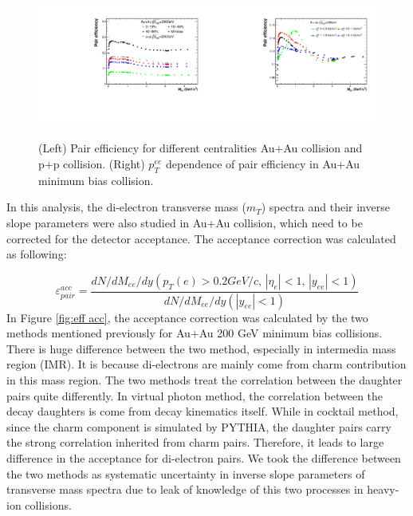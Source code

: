 \begin{figure}
\begin{centering}
\includegraphics[width=0.5\textwidth]{fig/3.Analysis/Run11/eff_cen}\includegraphics[width=0.5\textwidth]{fig/3.Analysis/Run11/eff_pT}
\par\end{centering}

\protect\caption{(Left) Pair efficiency for different centralities Au+Au collision
and p+p collision. (Right) $p_{T}^{ee}$ dependence of pair efficiency
in Au+Au minimum bias collision.}


\label{fig:pair eff}
\end{figure}
 

In this analysis, the di-electron transverse mass ($m_{T}$) spectra
and their inverse slope parameters were also studied in Au+Au collision,
which need to be corrected for the detector acceptance. The acceptance
correction was calculated as following:

\begin{equation}
\varepsilon_{pair}^{acc}=\frac{dN/dM_{ee}/dy(p_{T}(e)>0.2GeV/c,\,|\eta_{e}|<1,\,|y_{ee}|<1)}{dN/dM_{ee}/dy(|y_{ee}|<1)}\label{eq:eff acc}
\end{equation}
In Figure \ref{fig:eff acc}, the acceptance correction was calculated
by the two methods mentioned previously for Au+Au 200 GeV minimum
bias collisions. There is huge difference between the two method,
especially in intermedia mass region (IMR). It is because di-electrons
are mainly come from charm contribution in this mass region. The two
methods treat the correlation between the daughter pairs quite differently.
In virtual photon method, the correlation between the decay daughters
is come from decay kinematics itself. While in cocktail method, since
the charm component is simulated by PYTHIA, the daughter pairs carry
the strong correlation inherited from charm pairs. Therefore, it leads
to large difference in the acceptance for di-electron pairs. We took
the difference between the two methods as systematic uncertainty in
inverse slope parameters of transverse mass spectra due to leak of
knowledge of this two processes in heavy-ion collisions.

